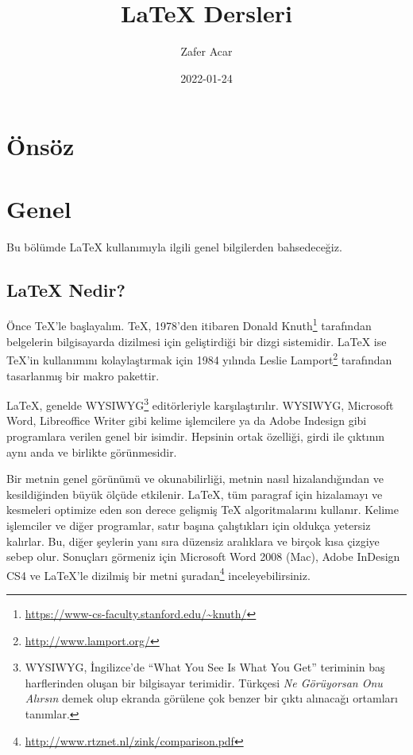 \documentclass[
  10pt,
]{scrbook}
\title{LaTeX Dersleri}
\author{Zafer Acar}
\date{2022-01-24}
\renewcommand{\href}[2]{#2\footnote{\url{#1}}}
\theoremstyle{definition}
\theoremstyle{definition}
\theoremstyle{definition}
\theoremstyle{definition}
\theoremstyle{remark}
\begin{document}
\maketitle



{
\setcounter{tocdepth}{2}
\tableofcontents
}
\listoffigures
\listoftables
\hypertarget{uxf6nsuxf6z}{%
\chapter*{Önsöz}\label{uxf6nsuxf6z}}

\mainmatter

\hypertarget{genel}{%
\chapter{Genel}\label{genel}}

Bu bölümde LaTeX kullanımıyla ilgili genel bilgilerden bahsedeceğiz.

\hypertarget{latex-nedir}{%
\section{LaTeX Nedir?}\label{latex-nedir}}

Önce TeX'le başlayalım. TeX, 1978'den itibaren \href{https://www-cs-faculty.stanford.edu/~knuth/}{Donald Knuth} tarafından belgelerin bilgisayarda dizilmesi için geliştirdiği bir dizgi sistemidir. LaTeX ise TeX'in kullanımını kolaylaştırmak için 1984 yılında \href{http://www.lamport.org/}{Leslie Lamport} tarafından tasarlanmış bir makro pakettir.

LaTeX, genelde WYSIWYG\footnote{WYSIWYG, İngilizce'de ``What You See Is What You Get'' teriminin baş harflerinden oluşan bir bilgisayar terimidir. Türkçesi \emph{Ne Görüyorsan Onu Alırsın} demek olup ekranda görülene çok benzer bir çıktı alınacağı ortamları tanımlar.} editörleriyle karşılaştırılır. WYSIWYG, Microsoft Word, Libreoffice Writer gibi kelime işlemcilere ya da Adobe Indesign gibi programlara verilen genel bir isimdir. Hepsinin ortak özelliği, girdi ile çıktının aynı anda ve birlikte görünmesidir.

Bir metnin genel görünümü ve okunabilirliği, metnin nasıl hizalandığından ve kesildiğinden büyük ölçüde etkilenir. LaTeX, tüm paragraf için hizalamayı ve kesmeleri optimize eden son derece gelişmiş TeX algoritmalarını kullanır. Kelime işlemciler ve diğer programlar, satır başına çalıştıkları için oldukça yetersiz kalırlar. Bu, diğer şeylerin yanı sıra düzensiz aralıklara ve birçok kısa çizgiye sebep olur. Sonuçları görmeniz için Microsoft Word 2008 (Mac), Adobe InDesign CS4 ve LaTeX'le dizilmiş bir metni \href{http://www.rtznet.nl/zink/comparison.pdf}{şuradan} inceleyebilirsiniz.
\end{document}
